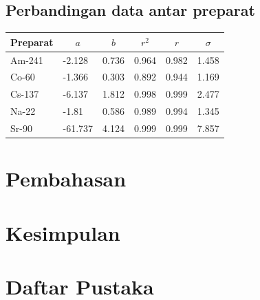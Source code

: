\documentclass{article}
\begin{document}
			\subsection{Perbandingan data antar preparat}
				\begin{longtable}{@{}llllll@{}}
					\toprule
					Preparat &
					\multicolumn{1}{c}{$a$} &
					\multicolumn{1}{c}{$b$} &
					\multicolumn{1}{c}{$r^{2}$} &
					\multicolumn{1}{c}{$r$} &
					\multicolumn{1}{c}{$\sigma$} \\* \midrule
					\endfirsthead
					\endhead
					\bottomrule
					\endfoot
					\endlastfoot
					Am-241 & -2.128  & 0.736 & 0.964 & 0.982 & 1.458 \\
					Co-60  & -1.366  & 0.303 & 0.892 & 0.944 & 1.169 \\
					Cs-137 & -6.137  & 1.812 & 0.998 & 0.999 & 2.477 \\
					Na-22  & -1.81   & 0.586 & 0.989 & 0.994 & 1.345 \\
					Sr-90  & -61.737 & 4.124 & 0.999 & 0.999 & 7.857 \\* \bottomrule
				\end{longtable}
			
	
	\section{Pembahasan}
	
	\section{Kesimpulan}
	
	\section{Daftar Pustaka}
	
	
\end{document}
